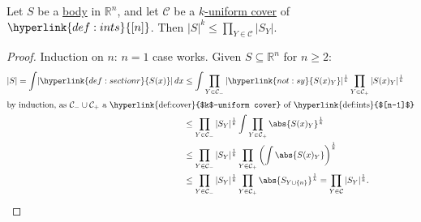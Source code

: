 \documentclass{article}
\let\subset\subseteq
\begin{document}
\begin{nthm}\label{thm:3.3}
  Let $S$ be a \hyperlink{def:body}{body} in $\mathbb{R}^n$, and let $\mathcal{C}$ be a \hyperlink{def:cover}{$k$-uniform cover} of $\hyperlink{def:ints}{[n]}$.
  Then $|S|^k \leq \prod_{Y \in \mathcal{C}} |S_Y|$.
\end{nthm}
\begin{proof}
  Induction on $n$: $n=1$ case works.
  Given $S \subset \mathbb{R}^n$ for $n \geq 2$:
  \begin{align*}
    |S| = \int\!|\hyperlink{def:sectionr}{S(x)}|\,dx &\leq \int \prod_{Y \in \mathcal{C}_-} |\hyperlink{not:sy}{S(x)_Y}|^{\frac 1 k}\prod_{Y \in \mathcal{C}_+} |S(x)_Y|^{\frac 1 k} \\
    \shortintertext{by induction, as $\mathcal{C}_- \cup \mathcal{C}_+$ a \hyperlink{def:cover}{$k$-uniform cover} of \hyperlink{def:ints}{$[n-1]$}}
                           &\leq \prod_{Y \in \mathcal{C}_-} |S_Y|^{\frac 1 k} \int \prod_{Y \in \mathcal{C}_+} \abs{S(x)_Y}^{\frac 1 k} \\
                           &\leq \prod_{Y \in \mathcal{C}_-} |S_Y|^{\frac 1 k} \prod_{Y \in \mathcal{C}_+} \left(\int \abs{S(x)_Y}\right)^{\frac 1 k} \\
                           &\leq \prod_{Y \in \mathcal{C}_-} |S_Y|^{\frac 1 k} \prod_{Y \in \mathcal{C}_+} \abs{S_{Y \cup \{n\}}}^{\frac 1 k} = \prod_{Y \in \mathcal{C}} |S_Y|^{\frac 1 k}. \qedhere
  \end{align*}
\end{proof}
\end{document}
